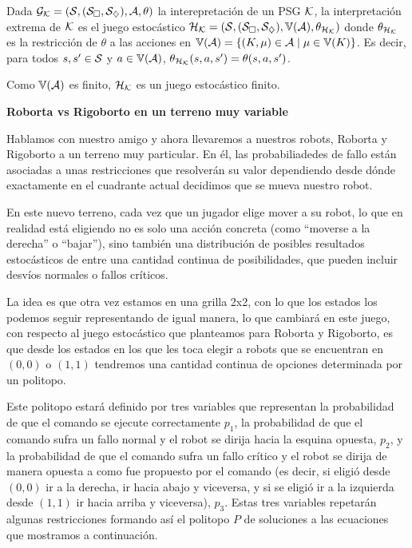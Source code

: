 \begin{definition}
	Dada $\mathcal{G}_{\mathcal{K}} = (\mathcal{S}, (\mathcal{S}_\square, \mathcal{S}_\diamondsuit), \mathcal{A}, \theta)$ la interepretación de un PSG $\mathcal{K}$, la interpretación extrema de $\mathcal{K}$ es el juego estocástico $\mathcal{H}_{\mathcal{K}} = (\mathcal{S}, (\mathcal{S}_\square, \mathcal{S}_\diamondsuit), \mathbb{V}(\mathcal{A}), \theta_{\mathcal{H}_{\mathcal{K}}})$ donde $\theta_{\mathcal{H}_{\mathcal{K}}}$ es la restricción de  $\theta$ a las acciones en $\mathbb{V}(\mathcal{A}) = \{(K, \mu) \in \mathcal{A} \mid \mu \in \mathbb{V}(K)\}$. Es decir, para todos $s, s' \in \mathcal{S}$ y $a \in \mathbb{V}(\mathcal{A})$, $\theta_{\mathcal{H}_{\mathcal{K}}}(s, a, s') = \theta(s, a, s')$.

	Como $\mathbb{V}(\mathcal{A})$ es finito, $\mathcal{H}_{\mathcal{K}}$ es un juego estocástico finito.
\end{definition}

\textbf{Roborta vs Rigoborto en un terreno muy variable}

Hablamos con nuestro amigo y ahora llevaremos a nuestros robots, Roborta y
Rigoborto a un terreno muy particular. En él, las probabiliadedes de fallo
están asociadas a unas restricciones que resolverán su valor dependiendo desde
dónde exactamente en el cuadrante actual decidimos que se mueva nuestro robot.

En este nuevo terreno, cada vez que un jugador elige mover a su robot, lo que
en realidad está eligiendo no es solo una acción concreta (como ``moverse a la
derecha'' o ``bajar''), sino también una distribución de posibles resultados
estocásticos de entre una cantidad continua de posibilidades, que pueden
incluir desvíos normales o fallos críticos.

La idea es que otra vez estamos en una grilla 2x2, con lo que los estados los
podemos seguir representando de igual manera, lo que cambiará en este juego,
con respecto al juego estocástico que planteamos para Roborta y Rigoborto, es
que desde los estados en los que les toca elegir a robots que se encuentran en
$(0,0)$ o $(1,1)$ tendremos una cantidad continua de opciones determinada por
un politopo.

Este politopo estará definido por tres variables que representan la
probabilidad de que el comando se ejecute correctamente $p_1$, la probabilidad
de que el comando sufra un fallo normal y el robot se dirija hacia la esquina
opuesta, $p_2$, y la probabilidad de que el comando sufra un fallo crítico y el
robot se dirija de manera opuesta a como fue propuesto por el comando (es
decir, si eligió desde $(0,0)$ ir a la derecha, ir hacia abajo y viceversa, y
si se eligió ir a la izquierda desde $(1,1)$ ir hacia arriba y viceversa),
$p_3$. Estas tres variables repetarán algunas restricciones formando así el
politopo $P$ de soluciones a las ecuaciones que mostramos a continuación.


